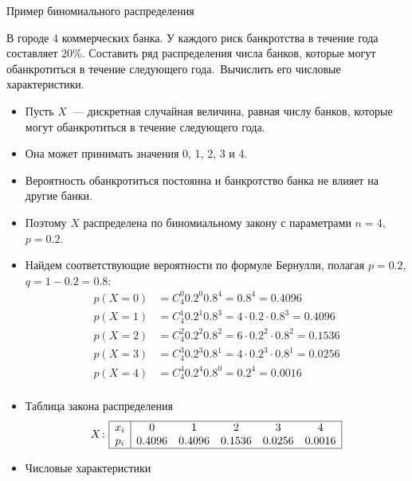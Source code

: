 \documentclass[unicode,11pt,notheorems,xcolor=table]{beamer}
\begin{document}
\begin{frame}[t, allowframebreaks]{Пример биномиального распределения}{}
    \begin{exampleblock}{}
        В городе 4 коммерческих банка. У каждого риск банкротства в течение года составляет 20\%.
         Составить ряд распределения числа банков, которые могут обанкротиться в течение следующего года. Вычислить его числовые характеристики.
    \end{exampleblock}
    \begin{itemize}
        \item Пусть $X$~--- дискретная случайная величина, равная числу банков, которые могут обанкротиться в течение следующего года. 
        \item Она может принимать значения 0, 1, 2, 3 и 4. 
        \item Вероятность обанкротиться постоянна и банкротство банка не влияет на другие банки.
        \item Поэтому \alert{$X$ распределена по биномиальному закону с параметрами $n = 4$, $p = 0.2$.}
        \item  Найдем соответствующие вероятности по формуле Бернулли, полагая $p=0.2$, $q=1-0.2=0.8$:
        $$
        \begin{aligned}
            p(X=0) &= C_4^0 0.2^0 0.8^4 = 0.8^4 = 0.4096\\
            p(X=1) &= C_4^1 0.2^1 0.8^3 = 4\cdot 0.2 \cdot 0.8^3 = 0.4096\\
            p(X=2) &= C_4^2 0.2^2 0.8^2 = 6\cdot 0.2^2 \cdot 0.8^2 = 0.1536\\
            p(X=3) &= C_4^3 0.2^3 0.8^1 = 4\cdot 0.2^3 \cdot 0.8^1 = 0.0256\\
            p(X=4) &= C_4^4 0.2^4 0.8^0 =  0.2^4 = 0.0016\\
        \end{aligned}
        $$
        \item Таблица закона распределения
        $$
            X\colon\begin{array}{|c|ccccc|}
            \hline
            x_i & 0 & 1 & 2 & 3 & 4 \\
            p_i & 0.4096 & 0.4096 & 0.1536 & 0.0256 &0.0016 \\
            \hline                
        \end{array}           
        $$    
        \item Числовые характеристики
        $$
            \begin{array}{|c|ccccc||c|}

\end{array}$$
\end{itemize}
\end{frame}
\end{document}
